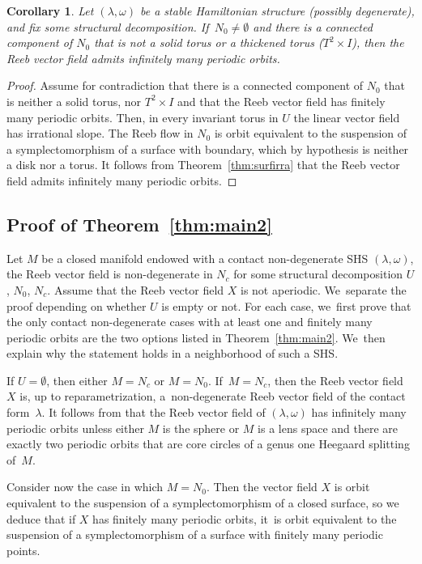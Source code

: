 \documentclass[10pt]{amsart}
\newtheorem{Corollary}[theorem]{Corollary}
\theoremstyle{definition}
\begin{document}
\begin{Corollary}
Let $(\lambda, \omega)$ be a stable Hamiltonian structure ({possibly} degenerate), and fix some structural decomposition. If~$N_0\neq \emptyset$ and there is a connected component of $N_0$ that is not a solid torus or a thickened torus ($T^2\times I$), then the Reeb vector field admits infinitely many periodic orbits.
\end{Corollary}

\begin{proof}
Assume for contradiction that there is a connected component of $N_0$ that is neither a solid torus, nor $T^2\times I$ and that the Reeb vector field has finitely many periodic orbits. Then, in every invariant torus in $U$ the linear vector field has irrational slope. The Reeb flow in $N_0$ is orbit equivalent to the suspension of a symplectomorphism of a surface with boundary, which by hypothesis is neither a disk nor a torus. It follows from Theorem~\ref{thm:surfirra} that the Reeb vector field admits infinitely many periodic orbits.
\end{proof}

\subsection{Proof of Theorem~\ref{thm:main2}}

Let $M$ be a closed manifold endowed with a contact non-degenerate SHS $(\lambda,\omega)$, \ie the Reeb vector field is non-degenerate in $N_c$ for some structural decomposition $U$, $N_0$, $N_c$. Assume that the Reeb vector field $X$ is not aperiodic. We~separate the proof depending on whether $U$ is empty or not. For each case, we~first prove that the only contact non-degenerate cases with at least one and finitely many periodic orbits are the two options listed in Theorem~\ref{thm:main2}. We~then explain why
the statement holds in a neighborhood of such a SHS.

{If $U\!=\!\emptyset$, then either $M\!=\!N_c$ or $M\!=\!N_0$. If~$M\!=\!N_c$,} then the Reeb vector field~$X$ is, up to reparametrization, a~non-degenerate Reeb vector field of the contact form~$\lambda$.
It follows from \cite[Th.\,1.2]{CDR} that the Reeb vector field of $(\lambda, \omega)$ has infinitely many periodic orbits unless either $M$ is the sphere or $M$ is a lens space and there are exactly two periodic orbits that are core circles of a genus one Heegaard splitting of~$M$.

Consider now the case in which $M=N_0$. Then the vector field $X$ is orbit equivalent to the suspension of a symplectomorphism of a closed surface, so we deduce that if $X$ has finitely many periodic orbits, it~is orbit equivalent to the suspension of a symplectomorphism of a surface with finitely many periodic points.
\end{document}
